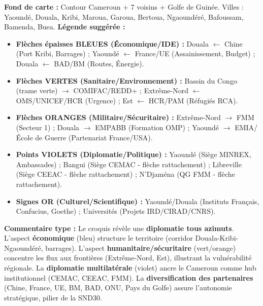 \documentclass[11pt]{article}
\begin{document}
\begin{corrige}
\textbf{Fond de carte :} Contour Cameroun + 7 voisins + Golfe de Guinée. Villes : Yaoundé, Douala, Kribi, Maroua, Garoua, Bertoua, Ngaoundéré, Bafoussam, Bamenda, Buea.
\textbf{Légende suggérée :}
\begin{itemize}
    \item \textbf{Flèches épaisses \textcolor{popblue}{BLEUES} (Économique/IDE) :} Douala $\leftarrow$ Chine (Port Kribi, Barrages) ; Yaoundé $\leftarrow$ France/UE (Assainissement, Budget) ; Douala $\leftarrow$ BAD/BM (Routes, Énergie).
    \item \textbf{Flèches \textcolor{popgreen}{VERTES} (Sanitaire/Environnement) :} Bassin du Congo (trame verte) $\rightarrow$ COMIFAC/REDD+ ; Extrême-Nord $\leftarrow$ OMS/UNICEF/HCR (Urgence) ; Est $\leftarrow$ HCR/PAM (Réfugiés RCA).
    \item \textbf{Flèches \textcolor{poporange}{ORANGES} (Militaire/Sécuritaire) :} Extrême-Nord $\rightarrow$ FMM (Secteur 1) ; Douala $\rightarrow$ EMPABB (Formation OMP) ; Yaoundé $\rightarrow$ EMIA/École de Guerre (Partenariat France/USA).
    \item \textbf{Points \textcolor{poppurple}{VIOLETS} (Diplomatie/Politique) :} Yaoundé (Siège MINREX, Ambassades) ; Bangui (Siège CEMAC - flèche rattachement) ; Libreville (Siège CEEAC - flèche rattachement) ; N'Djaména (QG FMM - flèche rattachement).
    \item \textbf{Signes \textcolor{popgold}{OR} (Culturel/Scientifique) :} Yaoundé/Douala (Instituts Français, Confucius, Goethe) ; Universités (Projets IRD/CIRAD/CNRS).
\end{itemize}
\textbf{Commentaire type :} Le croquis révèle une \textbf{diplomatie tous azimuts}. L'aspect \textbf{économique} (bleu) structure le territoire (corridor Douala-Kribi-Ngaoundéré, barrages). L'aspect \textbf{humanitaire/sécuritaire} (vert/orange) concentre les flux aux frontières (Extrême-Nord, Est), illustrant la vulnérabilité régionale. La \textbf{diplomatie multilatérale} (violet) ancre le Cameroun comme hub institutionnel (CEMAC, CEEAC, FMM). La \textbf{diversification des partenaires} (Chine, France, UE, BM, BAD, ONU, Pays du Golfe) assure l'autonomie stratégique, pilier de la SND30.
\end{corrige}
\end{document}
